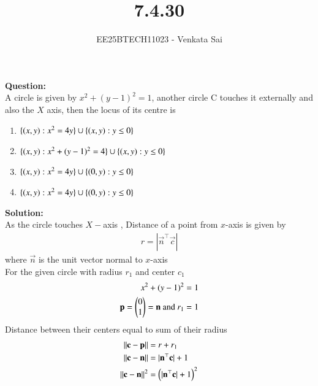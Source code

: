\documentclass[journal]{IEEEtran}
\begin{document}


\title{7.4.30}
\author{EE25BTECH11023 - Venkata Sai}
\maketitle \vspace{-1.5cm}
\renewcommand{\thefigure}{\theenumi}
\renewcommand{\thetable}{\theenumi}
\setlength{\intextsep}{10pt} %

\renewcommand{\thetable}{\theenumi}

\textbf{Question:}  \\
A circle is given by $x^2+(y - 1)^2=1$, another circle C touches it externally and also the $X$ axis, then the locus of its centre is
\begin{multicols}{2}
\begin{enumerate}[leftmargin =*]
    \item $\{\left(x,y\right) : x^2 = 4y\} \cup \{(x,y) : y \leq 0\}$
    \item $\{\left(x,y\right) : x^2+(y-1)^2 = 4\} \cup \{(x,y) : y \leq 0\}$
    \item $\{\left(x,y\right) : x^2 = 4y\} \cup \{(0,y) : y \leq 0\}$
    \item $\{\left(x,y\right) : x^2 = 4y\} \cup \{(0,y) : y \leq 0\}$
\end{enumerate}
\end{multicols}
\textbf{Solution:}  \\
As the circle touches $X-$axis , Distance of a point from $x$-axis is given by
\begin{align}
    r=|\vec{n}^\top\vec{c}|
\end{align}
where $\vec{n}$ is the unit vector normal to $x$-axis\\
For the given circle with radius $r_1$ and center $c_1$
\begin{align}
 x^2+(y - 1)^2=1\\
 \mathbf{p}=\begin{pmatrix}0\\1\end{pmatrix}=\mathbf{n}\ \text{and}\ r_1=1 
\end{align}
Distance between their centers equal to sum of their radius
\begin{align}
    \left\lVert\mathbf{c}-\mathbf{p}\right\rVert&=r+r_1\\
\left\lVert\mathbf{c}-\mathbf{n}\right\rVert&=|\mathbf{n}^\top\mathbf{c}|+1 \\
\left\lVert\mathbf{c}-\mathbf{n}\right\rVert^2&=\left(|\mathbf{n}^\top\mathbf{c}|+1\right)^2 
\end{align}
\end{document}
